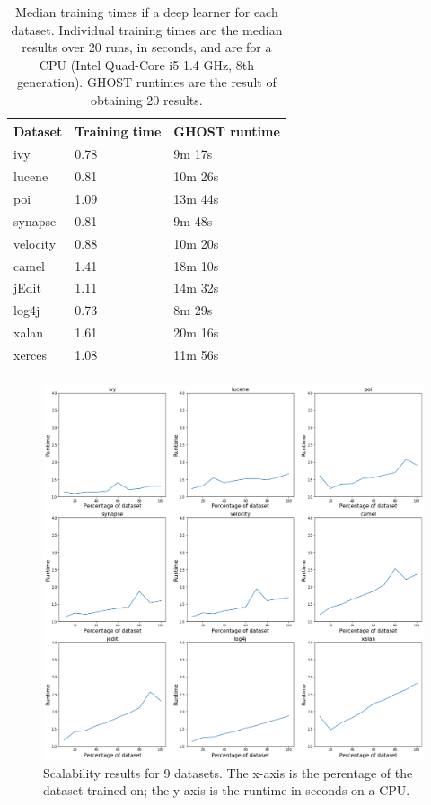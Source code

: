 \documentclass[10pt,compsoc,twocolumn]{IEEEtran}
\begin{document}
\begin{table}[!t]
    \centering
    \caption{Median training times if a deep learner for each dataset. Individual training times are the median results over 20 runs, in seconds, and are for a CPU (Intel Quad-Core i5 1.4 GHz, 8th generation). GHOST runtimes are the result of obtaining 20 results.}
    \begin{tabular}{lll}
        \toprule
        Dataset & Training time & GHOST runtime \\
        \midrule
        ivy & 0.78 & 9m 17s \\
        lucene & 0.81 & 10m 26s \\
        poi & 1.09 & 13m 44s \\
        synapse & 0.81 & 9m 48s \\
        velocity & 0.88 & 10m 20s \\
        camel & 1.41 & 18m 10s \\
        jEdit & 1.11 & 14m 32s\\
        log4j & 0.73 & 8m 29s\\
        xalan & 1.61 & 20m 16s\\
        xerces & 1.08 & 11m 56s \\
        \bottomrule \\
    \end{tabular}
    \label{tab:runtimes}
\end{table}
\begin{figure}[!t]
    \centering
    \includegraphics[width=\linewidth]{scalability.png}
    \caption{Scalability results for 9 datasets. The x-axis is the perentage of the dataset trained on; the y-axis is the runtime in seconds on a CPU.}
    \label{fig:scalability}
\end{figure}
\end{document}
